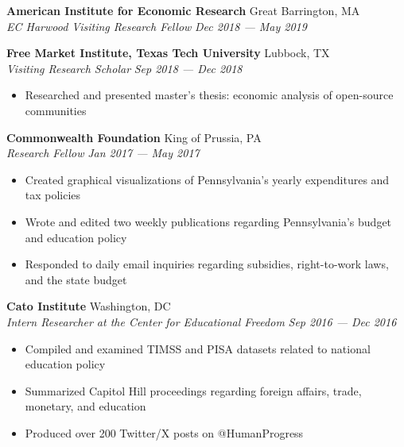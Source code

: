 \documentclass[a4paper,11pt]{article}
\begin{document}
\textbf{American Institute for Economic Research} \hfill Great Barrington, MA\\
\textit{EC Harwood Visiting Research Fellow} \hfill  \textit{Dec 2018 --- May 2019}
\vspace{1mm}

\textbf{Free Market Institute, Texas Tech University} \hfill Lubbock, TX\\
\textit{Visiting Research Scholar} \hfill  \textit{Sep 2018 --- Dec 2018}
\begin{itemize}
    \item Researched and presented master's thesis: economic analysis of open-source communities
\end{itemize}
\vspace{1mm}

\textbf{Commonwealth Foundation} \hfill King of Prussia, PA\\
\textit{Research Fellow} \hfill  \textit{Jan 2017 --- May 2017}
\begin{itemize}
    \item Created graphical visualizations of Pennsylvania's yearly expenditures and tax policies
    \item Wrote and edited two weekly publications regarding Pennsylvania's budget and education policy
    \item Responded to daily email inquiries regarding subsidies, right-to-work laws, and the state budget
\end{itemize}
\vspace{1mm}

\textbf{Cato Institute} \hfill Washington, DC\\
\textit{Intern Researcher at the Center for Educational Freedom} \hfill \textit{Sep 2016 --- Dec 2016}
\begin{itemize}
    \item Compiled and examined TIMSS and PISA datasets related to national education policy
    \item Summarized Capitol Hill proceedings regarding foreign affairs, trade, monetary, and education
    \item Produced over 200 Twitter/X posts on @HumanProgress
\end{itemize}
\vspace{1mm}

\end{document}
